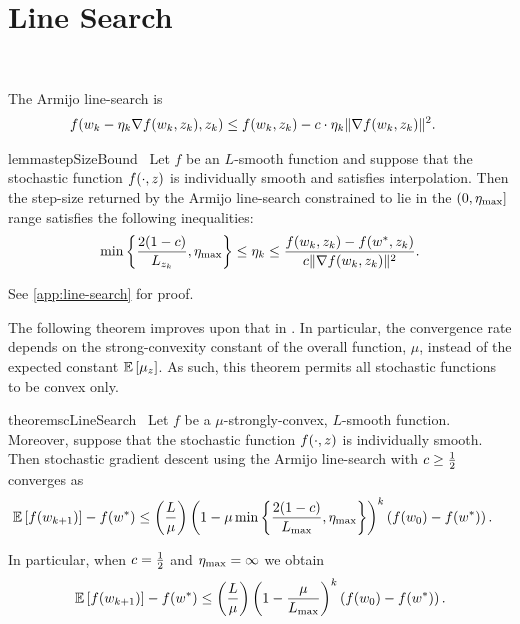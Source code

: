 
\chapter{Line Search}~\label{ch:line-search}

The Armijo line-search is 
\begin{align}
    f(w_k - \eta_k \nabla f(w_k, z_{k}), z_{k}) &\leq f(w_k, z_{k}) - c \cdot \eta_k \|\nabla f(w_k, z_{k})\|^2. \label{eq:armijo-ls}
\end{align}

\begin{restatable}{lemma}{stepSizeBound}~\label{lemma:step-size-bound}
    Let \( f \) be an \( L \)-smooth function and suppose that the stochastic function \( f(\cdot, z) \) is individually smooth and satisfies interpolation.
    Then the step-size returned by the Armijo line-search constrained to lie in the \( (0, \eta_{\text{max}}] \) range satisfies the following inequalities:
    \[ \min\left\{\frac{2 (1-c)}{L_{z_{k}}}, \eta_{\text{max}}\right\} \leq \eta_k \leq \frac{f(w_k, z_{k}) - f(w^*, z_{k})}{c \|\nabla f(w_k, z_{k})\|^2}. \]
\end{restatable}

See \autoref{app:line-search} for proof.

The following theorem improves upon that in \citet{vaswani2019painless}.
In particular, the convergence rate depends on the strong-convexity constant of the overall function, \( \mu \), instead of the expected constant \( \mathbb{E} \left[\mu_z\right] \).
As such, this theorem permits all stochastic functions to be convex only.

\begin{restatable}{theorem}{scLineSearch}~\label{thm:sc-line-search}
    Let \( f \) be a \( \mu \)-strongly-convex, \( L \)-smooth function.
    Moreover, suppose that the stochastic function \( f(\cdot, z) \) is individually smooth. 
    Then stochastic gradient descent using the Armijo line-search with \( c \geq \frac 1 2 \) converges as
    \begin{align*}
        \mathbb{E} \left[f(w_{k+1})\right] - f(w^*) &\leq \left(\frac{L}{\mu}\right)\left(1 - \mu \min\left\{\frac{2(1-c)}{L_{\text{max}}}, \eta_{\text{max}}\right\}\right)^k \left(f(w_0) - f(w^*)\right). 
    \end{align*}
\end{restatable}

In particular, when \( c = \frac 1 2 \) and \( \eta_{\text{max}} = \infty \) we obtain 
\[\mathbb{E} \left[f(w_{k+1})\right] - f(w^*) \leq \left(\frac{L}{\mu}\right)\left(1 - \frac{\mu}{L_{\text{max}}}\right)^k \left(f(w_0) - f(w^*)\right). \]


